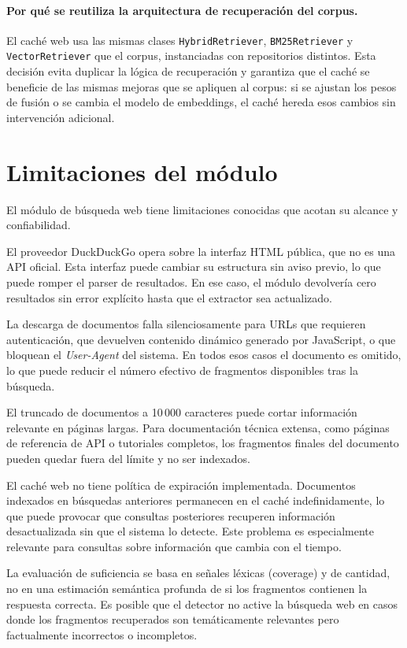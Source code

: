 \documentclass[11pt]{article}
\begin{document}
\paragraph{Por qué se reutiliza la arquitectura de recuperación del corpus.}
El caché web usa las mismas clases \texttt{HybridRetriever}, \texttt{BM25Retriever} y
\texttt{VectorRetriever} que el corpus, instanciadas con repositorios distintos. Esta decisión
evita duplicar la lógica de recuperación y garantiza que el caché se beneficie de las mismas
mejoras que se apliquen al corpus: si se ajustan los pesos de fusión o se cambia el modelo de
embeddings, el caché hereda esos cambios sin intervención adicional.

\section{Limitaciones del módulo}

El módulo de búsqueda web tiene limitaciones conocidas que acotan su alcance y confiabilidad.

El proveedor DuckDuckGo opera sobre la interfaz HTML pública, que no es una API oficial. Esta
interfaz puede cambiar su estructura sin aviso previo, lo que puede romper el parser de
resultados. En ese caso, el módulo devolvería cero resultados sin error explícito hasta que
el extractor sea actualizado.

La descarga de documentos falla silenciosamente para URLs que requieren autenticación, que
devuelven contenido dinámico generado por JavaScript, o que bloquean el \emph{User-Agent}
del sistema. En todos esos casos el documento es omitido, lo que puede reducir el número
efectivo de fragmentos disponibles tras la búsqueda.

El truncado de documentos a 10\,000 caracteres puede cortar información relevante en páginas
largas. Para documentación técnica extensa, como páginas de referencia de API o tutoriales
completos, los fragmentos finales del documento pueden quedar fuera del límite y no ser
indexados.

El caché web no tiene política de expiración implementada. Documentos indexados en búsquedas
anteriores permanecen en el caché indefinidamente, lo que puede provocar que consultas
posteriores recuperen información desactualizada sin que el sistema lo detecte. Este problema
es especialmente relevante para consultas sobre información que cambia con el tiempo.

La evaluación de suficiencia se basa en señales léxicas (coverage) y de cantidad, no en una
estimación semántica profunda de si los fragmentos contienen la respuesta correcta. Es posible
que el detector no active la búsqueda web en casos donde los fragmentos recuperados son
temáticamente relevantes pero factualmente incorrectos o incompletos.
\end{document}
